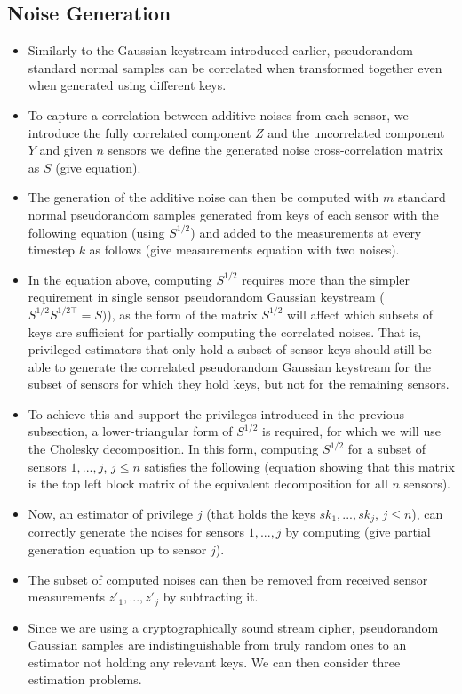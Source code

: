 \documentclass[conference]{IEEEtran}
\begin{document}
\subsection{Noise Generation}\label{subsec:noise_gen}
\begin{itemize}
  \item Similarly to the Gaussian keystream introduced earlier, pseudorandom standard normal samples can be correlated when transformed together even when generated using different keys.
  \item To capture a correlation between additive noises from each sensor, we introduce the fully correlated component $Z$ and the uncorrelated component $Y$ and given $n$ sensors we define the generated noise cross-correlation matrix as $S$ (give equation).
  \item The generation of the additive noise can then be computed with $m$ standard normal pseudorandom samples generated from keys of each sensor with the following equation (using $S^{1/2}$) and added to the measurements at every timestep $k$ as follows (give measurements equation with two noises).
  \item In the equation above, computing $S^{1/2}$ requires more than the simpler requirement in single sensor pseudorandom Gaussian keystream ($S^{1/2}S^{1/2\top}=S)$), as the form of the matrix $S^{1/2}$ will affect which subsets of keys are sufficient for partially computing the correlated noises. That is, privileged estimators that only hold a subset of sensor keys should still be able to generate the correlated pseudorandom Gaussian keystream for the subset of sensors for which they hold keys, but not for the remaining sensors.
  \item To achieve this and support the privileges introduced in the previous subsection, a lower-triangular form of $S^{1/2}$ is required, for which we will use the Cholesky decomposition. In this form, computing $S^{1/2}$ for a subset of sensors $1,...,j$, $j\leq n$ satisfies the following (equation showing that this matrix is the top left block matrix of the equivalent decomposition for all $n$ sensors).
  \item Now, an estimator of privilege $j$ (that holds the keys $sk_1,...,sk_j$, $j\leq n$), can correctly generate the noises for sensors $1,...,j$ by computing (give partial generation equation up to sensor $j$).
  \item The subset of computed noises can then be removed from received sensor measurements $z'_1,...,z'_j$ by subtracting it.
  \item Since we are using a cryptographically sound stream cipher, pseudorandom Gaussian samples are indistinguishable from truly random ones to an estimator not holding any relevant keys. We can then consider three estimation problems.

\end{itemize}
\end{document}
